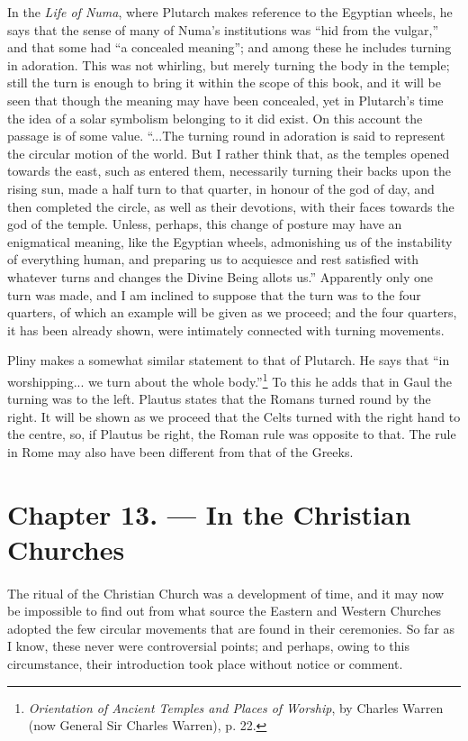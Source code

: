 \documentclass[a4paper, 11pt, oneside, polutonikogreek, english]{article}
\begin{document}
In the \emph{Life of Numa}, where Plutarch makes reference to the Egyptian wheels, he says that the sense of many of Numa's institutions was ``hid from the vulgar,'' and that some had ``a concealed meaning''; and among these he includes turning in adoration. This was not whirling, but merely turning the body in the temple; still the turn is enough to bring it within the scope of this book, and it will be seen that though the meaning may have been concealed, yet in Plutarch's time the idea of a solar symbolism belonging to it did exist. On this account the passage is of some value. ``...The turning round in adoration is said to represent the circular motion of the world. But I rather think that, as the temples opened towards the east, such as entered them, necessarily turning their backs upon the rising sun, made a half turn to that quarter, in honour of the god of day, and then completed the circle, as well as their devotions, with their faces towards the god of the temple. Unless, perhaps, this change of posture may have an enigmatical meaning, like the Egyptian wheels, admonishing us of the instability of everything human, and preparing us to acquiesce and rest satisfied with whatever turns and changes the Divine Being allots us.'' Apparently only one turn was made, and I am inclined to suppose that the turn was to the four quarters, of which an example will be given as we proceed; and the four quarters, it has been already shown, were intimately connected with turning movements.

Pliny makes a somewhat similar statement to that of Plutarch. He says that ``in worshipping... we turn about the whole body.''\footnote{\emph{Orientation of Ancient Temples and Places of Worship}, by Charles Warren (now General Sir Charles Warren), p. 22.} To this he adds that in Gaul the turning was to the left. Plautus states that the Romans turned round by the right. It will be shown as we proceed that the Celts turned with the right hand to the centre, so, if Plautus be right, the Roman rule was opposite to that. The rule in Rome may also have been different from that of the Greeks. 
\clearpage
\section{Chapter 13. --- In the Christian Churches}
\paragraph{}
The ritual of the Christian Church was a development of time, and it may now be impossible to find out from what source the Eastern and Western Churches adopted the few circular movements that are found in their ceremonies. So far as I know, these never were controversial points; and perhaps, owing to this circumstance, their introduction took place without notice or comment.
\end{document}
